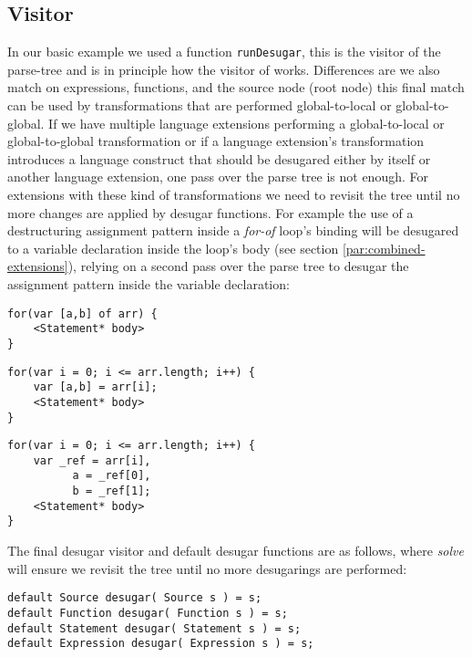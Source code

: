 \subsection{Visitor} \label{sec:visitor}
In our basic example we used a function \lstinline$runDesugar$, this is the visitor of the parse-tree and is in principle how the visitor of {\projectname} works. Differences are we also match on expressions, functions, and the source node (root node) this final match can be used by transformations that are performed global-to-local or global-to-global. If we have multiple language extensions performing a global-to-local or global-to-global transformation or if a language extension's transformation introduces a language construct that should be desugared either by itself or another language extension, one pass over the parse tree is not enough. For extensions with these kind of transformations we need to revisit the tree until no more changes are applied by desugar functions. For example the use of a destructuring assignment pattern inside a \textit{for-of} loop's binding will be desugared to a variable declaration inside the loop's body (see section \ref{par:combined-extensions}), relying on a second pass over the parse tree to desugar the assignment pattern inside the variable declaration:

\begin{minipage}[t]{0.4\textwidth}
\begin{lstlisting}
for(var [a,b] of arr) {
	<Statement* body>
}
\end{lstlisting}
\end{minipage}
\hfill
\begin{minipage}[t]{0.55\textwidth}
\begin{lstlisting}
for(var i = 0; i <= arr.length; i++) {
	var [a,b] = arr[i];	
	<Statement* body>
}
\end{lstlisting}
\end{minipage}
\begin{lstlisting}
for(var i = 0; i <= arr.length; i++) {
	var _ref = arr[i],
		  a = _ref[0],
		  b = _ref[1];
	<Statement* body>
}
\end{lstlisting}


The final desugar visitor and default desugar functions are as follows, where \textit{solve} will ensure we revisit the tree until no more desugarings are performed:

\begin{lstlisting}[caption=Identity desugar functions, language=rascal]
default Source desugar( Source s ) = s;
default Function desugar( Function s ) = s;
default Statement desugar( Statement s ) = s;
default Expression desugar( Expression s ) = s;
\end{lstlisting}

